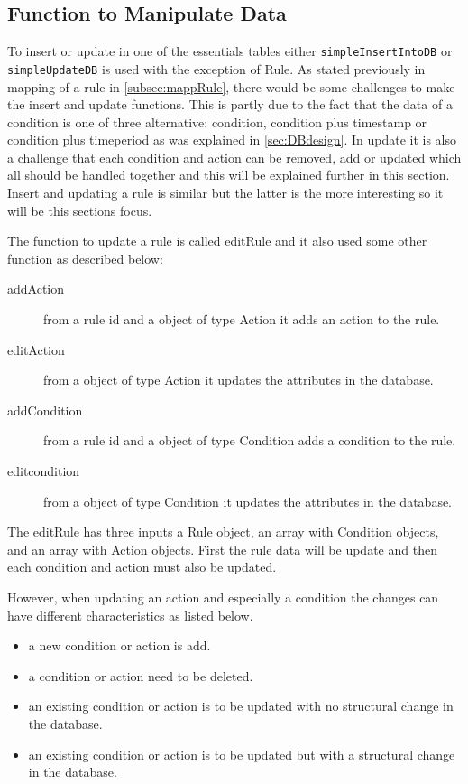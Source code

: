 \subsection{Function to Manipulate Data}
\label{subsec:dbRule}
To insert or update in one of the essentials tables either \texttt{simpleInsertIntoDB} or \texttt{simpleUpdateDB} is used with the exception of Rule. 
As stated previously in mapping of a rule in \vref{subsec:mappRule}, there would be some challenges to make the insert and update functions. This is partly due to the fact that the data of a condition  is one of three alternative: condition, condition plus timestamp or condition plus timeperiod as was explained in \vref{sec:DBdesign}.
In update it is also a challenge that each condition and action can be removed, add or updated which all should be handled together and this will be explained further in this section. Insert and updating a rule is similar but the latter is the more interesting so it will be this sections focus.

The function to update a rule is called editRule and it also used some other function as described below:

\begin{description}
	\item[addAction] from a rule id and a object of type Action it adds an action to the rule.
	\item[editAction] from a object of type Action it updates the attributes in the database.   
	\item[addCondition] from a rule id and a object of type Condition adds a condition to the rule.
	\item[editcondition] from a object of type Condition it updates the attributes in the database.   
\end{description}

The editRule has three inputs a Rule object, an array with Condition objects, and an array with Action objects. First the rule data will be update and then each condition and action must also be updated. 

However, when updating an action and especially a condition the changes can have different characteristics as listed below.

\begin{itemize}
	\item a new condition or action is add.
	\item a condition or action need to be deleted.
	\item an existing condition or action is to be updated with no structural change in the database.
	\item an existing condition or action is to be updated but with a structural change in the database.
\end{itemize}

